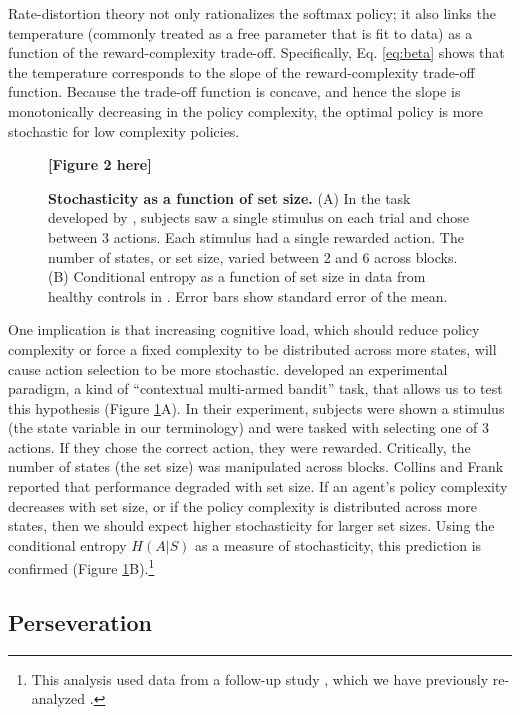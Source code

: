 \documentclass[11pt]{article}
\begin{document}
Rate-distortion theory not only rationalizes the softmax policy; it also links the temperature (commonly treated as a free parameter that is fit to data) as a function of the reward-complexity trade-off. Specifically, Eq. \ref{eq:beta} shows that the temperature corresponds to the slope of the reward-complexity trade-off function. Because the trade-off function is concave, and hence the slope is monotonically decreasing in the policy complexity, the optimal policy is more stochastic for low complexity policies.

\begin{figure}
    \centering
    \textbf{[Figure 2 here]}
    \caption{\textbf{Stochasticity as a function of set size.} (A) In the task developed by \cite{collins12}, subjects saw a single stimulus on each trial and chose between 3 actions. Each stimulus had a single rewarded action. The number of states, or set size, varied between 2 and 6 across blocks.  (B) Conditional entropy as a function of set size in data from healthy controls in \citet{collins14}. Error bars show standard error of the mean.}
    \label{fig:stochasticity}
\end{figure}

One implication is that increasing cognitive load, which should reduce policy complexity or force a fixed complexity to be distributed across more states, will cause action selection to be more stochastic. \citet{collins12} developed an experimental paradigm, a kind of ``contextual multi-armed bandit'' task, that allows us to test this hypothesis (Figure \ref{fig:stochasticity}A). In their experiment, subjects were shown a stimulus (the state variable in our terminology) and were tasked with selecting one of 3 actions. If they chose the correct action, they were rewarded. Critically, the number of states (the set size) was manipulated across blocks. Collins and Frank reported that performance degraded with set size. If an agent's policy complexity decreases with set size, or if the policy complexity is distributed across more states, then we should expect higher stochasticity for larger set sizes. Using the conditional entropy $H(A|S)$ as a measure of stochasticity, this prediction is confirmed (Figure \ref{fig:stochasticity}B).\footnote{This analysis used data from a follow-up study \citep{collins14}, which we have previously re-analyzed \citep{gershmanlai20}.}


\subsection{Perseveration}
\end{document}

